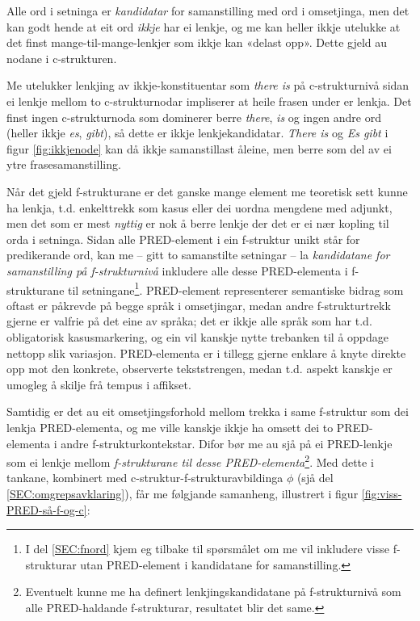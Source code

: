 \documentclass[11pt,a4paper,oneside,draft]{book}
\begin{document}
Alle ord i setninga er \emph{kandidatar} for samanstilling med ord i
omsetjinga, men det kan godt hende at eit ord \emph{ikkje} har ei lenkje,
og me kan heller ikkje utelukke at det finst mange-til-mange-lenkjer
som ikkje kan «delast opp». Dette gjeld au nodane i c-strukturen.

Me utelukker lenkjing av ikkje-konstituentar som \emph{there is} på
c-strukturnivå sidan ei lenkje mellom to c-strukturnodar impliserer at
heile frasen under er lenkja. Det finst ingen c-strukturnoda som
dominerer berre \emph{there}, \emph{is} og ingen andre ord (heller ikkje \emph{es},
\emph{gibt}), så dette er ikkje lenkjekandidatar.  \emph{There is} og \emph{Es gibt}
i figur \ref{fig:ikkjenode} kan då ikkje samanstillast åleine, men
berre som del av ei ytre frasesamanstilling.

Når det gjeld f-strukturane er det ganske mange element me teoretisk
sett kunne ha lenkja, t.d. enkelttrekk som kasus eller dei uordna
mengdene med adjunkt, men det som er mest \emph{nyttig} er nok å berre
lenkje der det er ei nær kopling til orda i setninga. Sidan alle
PRED-element i ein f-struktur unikt står for predikerande ord, kan me
-- gitt to samanstilte setningar -- la \emph{kandidatane for
samanstilling på f-strukturnivå} inkludere alle desse PRED-elementa i
f-strukturane til setningane\footnote{I del \ref{SEC:fnord} kjem eg tilbake til spørsmålet om me vil
        inkludere visse f-strukturar utan PRED-element i kandidatane
        for samanstilling. }. PRED-element representerer
semantiske bidrag som oftast er påkrevde på begge språk i omsetjingar,
medan andre f-strukturtrekk gjerne er valfrie på det eine av språka;
det er ikkje alle språk som har t.d. obligatorisk kasusmarkering, og
ein vil kanskje nytte trebanken til å oppdage nettopp slik variasjon.
 PRED-elementa er i tillegg
gjerne enklare å knyte direkte opp mot den konkrete, observerte
tekststrengen, medan t.d. aspekt kanskje er umogleg å skilje frå
tempus i affikset.

Samtidig er det au eit omsetjingsforhold mellom trekka i same
f-struktur som dei lenkja PRED-elementa, og me ville kanskje ikkje ha
omsett dei to PRED-elementa i andre f-strukturkontekstar. Difor bør me
au sjå på ei PRED-lenkje som ei lenkje mellom \emph{f-strukturane til
desse PRED-elementa}\footnote{Eventuelt kunne me ha definert lenkjingskandidatane på
       f-strukturnivå som alle PRED-haldande f-strukturar, resultatet
       blir det same. }.  Med dette i tankane, kombinert med
c-struktur-f-strukturavbildinga $\phi$ (sjå del
\ref{SEC:omgrepsavklaring}), får me følgjande samanheng, illustrert i
figur \ref{fig:viss-PRED-så-f-og-c}:
\end{document}
